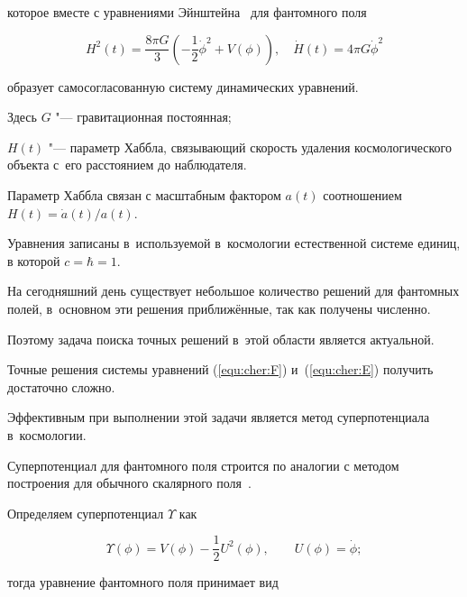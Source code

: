 которое вместе с уравнениями Эйнштейна~\cite{chervon:wald} для фантомного поля

\begin{equation} \label{equ:cher:E}

H^2(t)=\frac{8\pi G}{3} \left(-\frac12 \dot{\phi}^2+V(\phi)\right) ,\quad

\dot{H}(t) = 4\pi G \dot{\phi}^2%

\end{equation}

образует самосогласованную систему динамических уравнений.

Здесь $G$ "--- гравитационная постоянная;

$ H(t) $ "--- параметр Хаббла, связывающий скорость удаления космологического объекта с~его расстоянием до наблюдателя. 

Параметр Хаббла связан с масштабным фактором $a(t)$ соотношением  $ H(t)  =  \dot{a}(t)/a(t) $. 

Уравнения записаны в~используемой в~космологии естественной системе единиц, в которой $ c = \hbar = 1$.



На сегодняшний день существует небольшое количество решений для фантомных полей, в~основном эти решения приближённые, так как получены численно. 

Поэтому задача поиска точных решений в~этой области является актуальной.



\smallskip




Точные решения системы уравнений (\ref{equ:cher:F}) и~(\ref{equ:cher:E}) получить  достаточно сложно.

Эффективным при выполнении этой задачи является метод суперпотенциала в~космологии.

Суперпотенциал для фантомного поля строится по аналогии с методом построения для обычного скалярного поля~\cite{chervon:cs09ir}. 

Определяем суперпотенциал $\Upsilon $ как

\begin{equation*} %

\Upsilon (\phi)=V(\phi)-\frac12 U^2(\phi), \qquad U(\phi)=\dot\phi;%

\end{equation*}

тогда уравнение фантомного поля принимает вид

